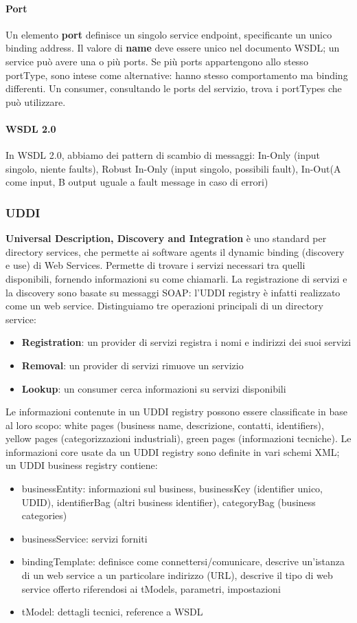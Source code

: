 \documentclass[11pt]{article}
\begin{document}
\paragraph{Port} Un elemento \textbf{port} definisce un singolo service endpoint, specificante un unico binding address. Il valore di \textbf{name} deve essere unico nel documento WSDL; un service può avere una o più ports. Se più ports appartengono allo stesso portType, sono intese come alternative: hanno stesso comportamento ma binding differenti. Un consumer, consultando le ports del servizio, trova i portTypes che può utilizzare.
\paragraph{WSDL 2.0} In WSDL 2.0, abbiamo dei pattern di scambio di messaggi: In-Only (input singolo, niente faults), Robust In-Only (input singolo, possibili fault), In-Out(A come input, B output uguale a fault message in caso di errori)
\subsubsection{UDDI}
\textbf{Universal Description, Discovery and Integration} è uno standard per directory services, che permette ai software agents il dynamic binding (discovery e use) di Web Services. Permette di trovare i servizi necessari tra quelli disponibili, fornendo informazioni su come chiamarli. La registrazione di servizi e la discovery sono basate su messaggi SOAP: l'UDDI registry è infatti realizzato come un web service.  
Distinguiamo tre operazioni principali di un directory service:
\begin{itemize}
    \item \textbf{Registration}: un provider di servizi registra i nomi e indirizzi dei suoi servizi 
    \item \textbf{Removal}: un provider di servizi rimuove un servizio
    \item \textbf{Lookup}: un consumer cerca informazioni su servizi disponibili
\end{itemize}
Le informazioni contenute in un UDDI registry possono essere classificate in base al loro scopo: white pages (business name, descrizione, contatti, identifiers), yellow pages (categorizzazioni industriali), green pages (informazioni tecniche). 
Le informazioni core usate da un UDDI registry sono definite in vari schemi XML; un UDDI business registry contiene:
\begin{itemize}
    \item businessEntity: informazioni sul business, businessKey (identifier unico, UDID), identifierBag (altri business identifier), categoryBag (business categories)
    \item businessService: servizi forniti
    \item bindingTemplate: definisce come connettersi/comunicare, descrive un'istanza di un web service a un particolare indirizzo (URL), descrive il tipo di web service offerto riferendosi ai tModels, parametri, impostazioni
    \item tModel: dettagli tecnici, reference a WSDL
\end{itemize}
\end{document}
